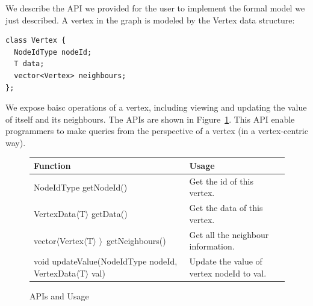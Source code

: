 \documentclass[11pt]{article}
\begin{document}
We describe the API we provided for the user to implement
the formal model we just described.
A vertex in the graph is modeled by the \textsf{Vertex} data structure:
\begin{verbatim}
class Vertex {
  NodeIdType nodeId;
  T data;
  vector<Vertex> neighbours;
};
\end{verbatim}
We expose baisc operations of a vertex, including viewing and updating the 
value of itself and its neighbours. The APIs are shown in 
Figure~\ref{fig:api}. This API enable programmers to make queries 
from the perspective of a vertex (in a vertex-centric way). 

\begin{figure}
  \centering
  \small
 \begin{tabular}{l|l}
 \hline
 Function & Usage\\
 \hline
 NodeIdType getNodeId() & Get the id of this vertex.\\
 VertexData$\langle$T$\rangle$ getData() & Get the data of this vertex.\\
 vector$\langle$Vertex$\langle$T$\rangle$ $\rangle$\ getNeighbours() & Get all 
the neighbour information.\\
 void updateValue(NodeIdType nodeId, VertexData$\langle$T$\rangle$ val) & Update 
the value of vertex nodeId to val.\\
 \hline
 \end{tabular}
 \caption{APIs and Usage}
 \label{fig:api}
\end{figure}
\end{document}
